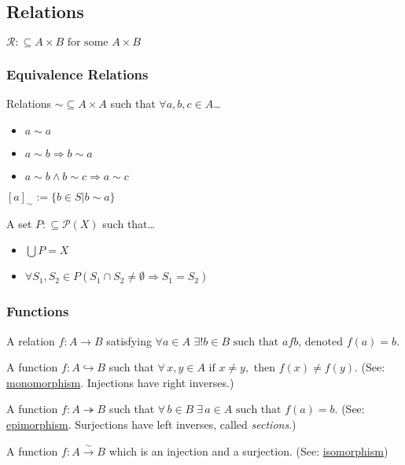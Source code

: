 \subsection{Relations}\label{relations}
$\mathcal{R} :\subseteq A \times B \textrm{ for some } A \times B$

\subsubsection{Equivalence Relations}\label{equivalencerelation}
Relations $\sim \subseteq A \times A$ such that $\forall a,b,c \in A$\dots
\begin{itemize}
  \item $a \sim a$
  \item $a \sim b \Rightarrow b \sim a$
  \item $a \sim b \land b \sim c \Rightarrow a \sim c$
\end{itemize}

$[a]_{\sim} := \{ b \in S | b \sim a \}$ 

A set $P :\subseteq \mathcal{P}(X)$ such that\dots
\begin{itemize}
  \item $\bigcup P = X$
  \item $\forall S_1, S_2 \in P (S_1 \cap S_2 \neq \emptyset \Rightarrow S_1 = S_2)$
\end{itemize}

\subsubsection{Functions}\label{function}
A relation $f: A \rightarrow B$ satisfying $\forall a \in A$ \mbox{$\exists! b \in B \textrm{ such that } afb \textrm{, denoted } f(a) = b$.}

\label{injection}
A function $\ensuremath{f: A \hookrightarrow B}$ such that $\forall \, x,y \in A \textrm{ if } x \neq y, \textrm{ then } f(x) \neq f(y)$. (See: \hyperref[monomorphism]{monomorphism}. Injections have right inverses.)

\label{surjection}
A function $\ensuremath{f: A \twoheadrightarrow B}$ such that $\forall \, b \in B \; \exists \, a \in A \textrm{ such that } f(a) = b$. (See: \hyperref[epimorphism]{epimorphism}. Surjections have left inverses, called \emph{sections}.)

\label{bijection}
A function $f: A \xrightarrow{\sim} B$ which is an injection and a surjection. (See: \hyperref[isomorphism]{isomorphism})

